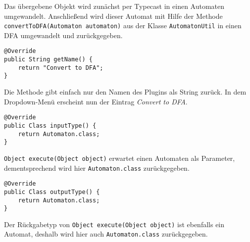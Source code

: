 Das übergebene Objekt wird zunächst per Typecast in einen Automaten umgewandelt. Anschließend wird dieser Automat mit Hilfe der Methode \lstinline[columns=fixed]{convertToDFA(Automaton automaton)} aus der Klasse \lstinline[columns=fixed]{AutomatonUtil} in einen DFA umgewandelt und zurückgegeben.
\begin{lstlisting}[frame=single, basicstyle=\small, caption=Die Methode \textit{getName}]
@Override
public String getName() {
	return "Convert to DFA";
}
\end{lstlisting}
Die Methode gibt einfach nur den Namen des Plugins als String zurück. In dem Dropdown-Menü erscheint nun der Eintrag \textit{Convert to DFA}.
\begin{lstlisting}[frame=single, basicstyle=\small, caption=Die Methode \textit{inputType}]
@Override
public Class inputType() {
	return Automaton.class;
}
\end{lstlisting}
\lstinline[columns=fixed]{Object execute(Object object)} erwartet einen Automaten als Parameter, dementsprechend wird hier \lstinline[columns=fixed]{Automaton.class} zurückgegeben.
\begin{lstlisting}[frame=single, basicstyle=\small, caption=Die Methode \textit{outputType}]
@Override
public Class outputType() {
	return Automaton.class;
}
\end{lstlisting}
Der Rückgabetyp von \lstinline[columns=fixed]{Object execute(Object object)} ist ebenfalls ein Automat, deshalb wird hier auch \lstinline[columns=fixed]{Automaton.class} zurückgegeben.
